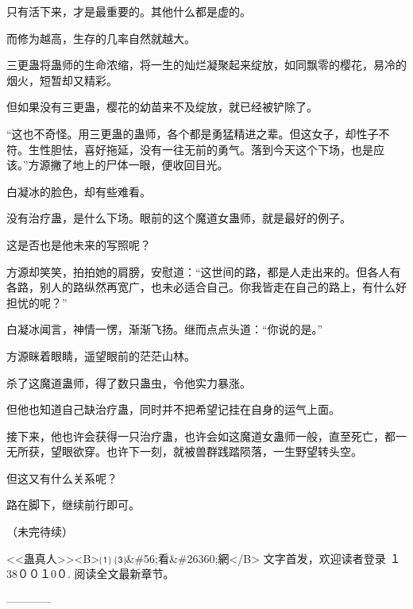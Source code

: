 \begin{this_body}
只有活下来，才是最重要的。其他什么都是虚的。

而修为越高，生存的几率自然就越大。

三更蛊将蛊师的生命浓缩，将一生的灿烂凝聚起来绽放，如同飘零的樱花，易冷的烟火，短暂却又精彩。

但如果没有三更蛊，樱花的幼苗来不及绽放，就已经被铲除了。

“这也不奇怪。用三更蛊的蛊师，各个都是勇猛精进之辈。但这女子，却性子不符。生性胆怯，喜好拖延，没有一往无前的勇气。落到今天这个下场，也是应该。”方源撇了地上的尸体一眼，便收回目光。

白凝冰的脸色，却有些难看。

没有治疗蛊，是什么下场。眼前的这个魔道女蛊师，就是最好的例子。

这是否也是他未来的写照呢？

方源却笑笑，拍拍她的肩膀，安慰道：“这世间的路，都是人走出来的。但各人有各路，别人的路纵然再宽广，也未必适合自己。你我皆走在自己的路上，有什么好担忧的呢？”

白凝冰闻言，神情一愣，渐渐飞扬。继而点点头道：“你说的是。”

方源眯着眼睛，遥望眼前的茫茫山林。

杀了这魔道蛊师，得了数只蛊虫，令他实力暴涨。

但他也知道自己缺治疗蛊，同时并不把希望记挂在自身的运气上面。

接下来，他也许会获得一只治疗蛊，也许会如这魔道女蛊师一般，直至死亡，都一无所获，望眼欲穿。也许下一刻，就被兽群践踏陨落，一生野望转头空。

但这又有什么关系呢？

路在脚下，继续前行即可。

（未完待续）

<<蛊真人>><B>⑴ ⑶\&\#56;看\&\#26360;網</B> 文字首发，欢迎读者登录 １38００１0０. 阅读全文最新章节。

------------

\end{this_body}

